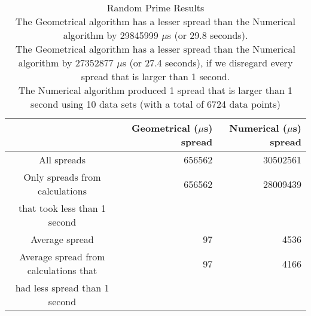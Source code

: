 \begin{table}[bth!]\footnotesize
 \begin{tabular}[3]{c|r|r}
 & Geometrical ($\mu$s) spread & Numerical ($\mu$s) spread\\
\hline
All spreads & 656562 & 30502561 \\ 
\hline 
Only spreads from calculations & 656562 & 28009439 \\ 
that took less than 1 second & & \\ 
\hline
Average spread & 97 & 4536 \\
\hline
Average spread from calculations that & 97 & 4166 \\ 
had less spread than 1 second & & \\ 
\end{tabular}\\ \\
\caption{Random Prime Results\\
The Geometrical algorithm has a lesser spread than the Numerical algorithm by 29845999 $\mu$s (or 29.8 seconds).\\
The Geometrical algorithm has a lesser spread than the Numerical algorithm by 27352877 $\mu$s (or 27.4 seconds), if we disregard every spread that is larger than 1 second.\\
The Numerical algorithm produced 1 spread that is larger than 1 second using 10 data sets (with a total of 6724 data points)}\label{prime-random_spreadtable}\end{table}